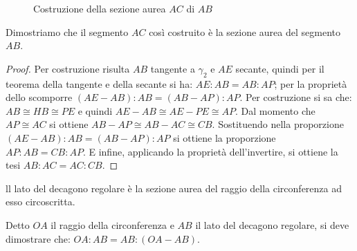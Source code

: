 \begin{inaccessibleblock}
 \begin{figure}[!htb]
	\centering
	\caption{Costruzione della sezione aurea \(AC\) di 
\(AB\)}\label{fig:sez_aurea2}
\end{figure}
\end{inaccessibleblock}

Dimostriamo che il segmento \(AC\) così costruito è la sezione aurea 
del segmento \(AB\).
\begin{proof}
Per costruzione risulta \(AB\) tangente a \(\gamma_2\) e \(AE\) secante, 
quindi per il teorema della tangente e della secante si ha: \(AE : AB 
= AB : AP\); per la proprietà dello scomporre \((AE-AB):AB=(AB-AP):AP\).
Per costruzione si sa che: \(AB\cong HB\cong PE\) e quindi \(AE - AB 
\cong AE - PE\cong AP\).
Dal momento che \(AP\cong AC\) si ottiene \(AB - AP \cong AB - AC \cong 
CB\).
Sostituendo nella proporzione \((AE-AB):AB=(AB-AP):AP\) si ottiene la 
proporzione \(AP : AB = CB : AP\).
E infine, applicando la proprietà dell'invertire, si ottiene la tesi 
\(AB : AC = AC : CB\).
\end{proof}

\begin{teorema}
ll lato del decagono regolare è la sezione aurea del raggio della 
circonferenza ad esso circoscritta.
\end{teorema}

Detto \(OA\) il raggio della circonferenza e \(AB\) il lato del decagono 
regolare, si deve dimostrare che: \(OA:AB=AB:(OA-AB)\).

\begin{figure*}[!htb]
	\begin{center}
		\begin{minipage}{0.45\textwidth}
			\centering
			
		\end{minipage}
		\hspace{0.03\textwidth}	
		\begin{minipage}{0.45\textwidth}
			\centering
			
		\end{minipage}
	\end{center}
\end{figure*}

